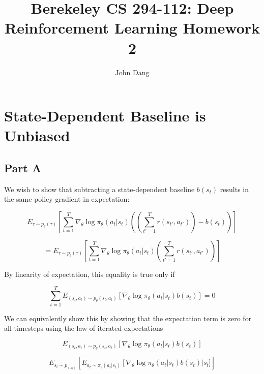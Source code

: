 \documentclass{article}
\title{Berekeley CS 294-112: Deep Reinforcement Learning Homework 2}
\author{John Dang}
\date{}
\begin{document}
    \maketitle

    \section{State-Dependent Baseline is Unbiased}

    \subsection{Part A}
    We wish to show that subtracting a state-dependent baseline $b(s_t)$ 
    results in the same policy gradient in expectation:

    \begin{equation*}
        E_{\tau\sim p_\theta(\tau)} \left[ \sum_{t=1}^T{\nabla_\theta \log \pi_\theta(a_t|s_t)} \left( \left( \sum_{t'=1}^T{r(s_{t'},a_{t'})} \right) - b(s_t)\right)\right]
    \end{equation*}

    \begin{equation*}
        = E_{\tau\sim p_\theta(\tau)} \left[ \sum_{t=1}^T{\nabla_\theta \log \pi_\theta(a_t|s_t)} \left( \sum_{t'=1}^T{r(s_{t'},a_{t'})}\right)\right]
    \end{equation*}

   By linearity of expectation, this equality is true only if 

    \begin{equation*}
       \sum_{t=1}^{T}{ E_{(s_t,a_t)\sim p_\theta(s_t,a_t)} \left[ \nabla_\theta \log \pi_\theta(a_t|s_t) b(s_t)\right]} = 0
    \end{equation*}


    We can equivalently show this by showing that the  expectation term is zero for all timesteps using the law of iterated expectations

    \begin{equation*}
        E_{(s_t,a_t)\sim p_\theta(s_t,a_t)} \left[ \nabla_\theta \log \pi_\theta(a_t|s_t) b(s_t)\right]
    \end{equation*}

    \begin{equation*}
        E_{s_t\sim p_(s_t)} \left[ E_{a_t\sim \pi_\theta(a_t|s_t)}\left[\nabla_\theta \log \pi_\theta(a_t|s_t) b(s_t)\right | s_t]\right]
    \end{equation*}
\end{document}
